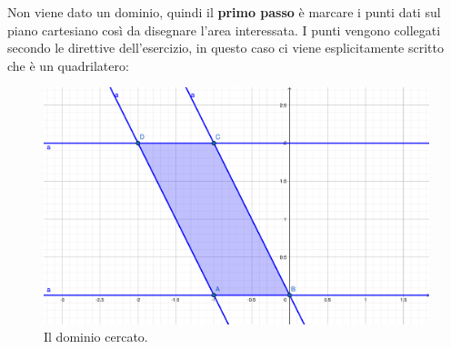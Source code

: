 \documentclass[a4paper]{article}
\begin{document}
	\noindent
	Non viene dato un dominio, quindi il \textbf{primo passo} è marcare i punti dati sul piano cartesiano così da disegnare l'area interessata. I punti vengono collegati secondo le direttive dell'esercizio, in questo caso ci viene esplicitamente scritto che è un quadrilatero:
	\begin{figure}[!htp]
		\centering
		\includegraphics[width=.8\textwidth]{img/grafico-ex6-5.pdf}
		\caption*{Il dominio cercato.}
	\end{figure}\newpage
\end{document}
